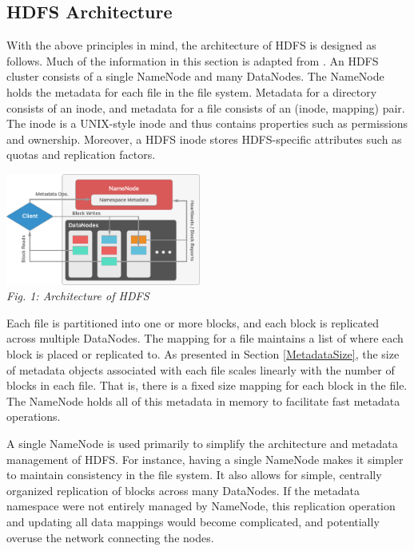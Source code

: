 \documentclass[11pt, a4paper]{article}
\begin{document}
\begin{multicols*}{2}
\section{HDFS Architecture}
With the above principles in mind, the architecture of HDFS is designed as follows. Much of the information in this section is adapted from \cite{HdfsArch}. An HDFS cluster consists of a single NameNode and many DataNodes. The NameNode holds the metadata for each file in the file system. Metadata for a directory consists of an inode, and metadata for a file consists of an (inode, mapping) pair. The inode is a UNIX-style inode and thus contains properties such as permissions and ownership. Moreover, a HDFS inode stores HDFS-specific attributes such as quotas and replication factors.

\begin{center}
	\includegraphics[keepaspectratio=true, width=0.48\textwidth]{Architecture}\\
	\textit{Fig. 1: Architecture of HDFS}
\end{center}

Each file is partitioned into one or more blocks, and each block is replicated across multiple DataNodes. The mapping for a file maintains a list of where each block is placed or replicated to. As presented in Section \ref{MetadataSize}, the size of metadata objects associated with each file scales linearly with the number of blocks in each file. That is, there is a fixed size mapping for each block in the file. The NameNode holds all of this metadata in memory to facilitate fast metadata operations.

A single NameNode is used primarily to simplify the architecture and metadata management of HDFS. For instance, having a single NameNode makes it simpler to maintain consistency in the file system. It also allows for simple, centrally organized replication of blocks across many DataNodes. If the metadata namespace were not entirely managed by NameNode, this replication operation and updating all data mappings would become complicated, and potentially overuse the network connecting the nodes.


\end{multicols*}
\end{document}
